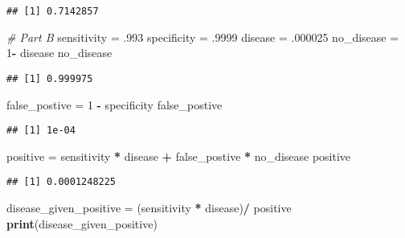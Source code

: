 \documentclass[
]{article}
\newenvironment{Shaded}{\begin{snugshade}}{\end{snugshade}}
\newcommand{\CommentTok}[1]{\textcolor[rgb]{0.56,0.35,0.01}{\textit{#1}}}
\newcommand{\DecValTok}[1]{\textcolor[rgb]{0.00,0.00,0.81}{#1}}
\newcommand{\FunctionTok}[1]{\textcolor[rgb]{0.13,0.29,0.53}{\textbf{#1}}}
\newcommand{\NormalTok}[1]{#1}
\newcommand{\OtherTok}[1]{\textcolor[rgb]{0.56,0.35,0.01}{#1}}
\newcommand{\SpecialCharTok}[1]{\textcolor[rgb]{0.81,0.36,0.00}{\textbf{#1}}}
\begin{document}
\begin{verbatim}
## [1] 0.7142857
\end{verbatim}

\begin{Shaded}
\begin{Highlighting}[]
\CommentTok{\# Part B}
\NormalTok{sensitivity }\OtherTok{=}\NormalTok{ .}\DecValTok{993}
\NormalTok{specificity }\OtherTok{=}\NormalTok{ .}\DecValTok{9999}
\NormalTok{disease }\OtherTok{=}\NormalTok{ .}\DecValTok{000025}
\NormalTok{no\_disease }\OtherTok{=} \DecValTok{1}\SpecialCharTok{{-}}\NormalTok{ disease}
\NormalTok{no\_disease}
\end{Highlighting}
\end{Shaded}

\begin{verbatim}
## [1] 0.999975
\end{verbatim}

\begin{Shaded}
\begin{Highlighting}[]
\NormalTok{false\_postive }\OtherTok{=} \DecValTok{1} \SpecialCharTok{{-}}\NormalTok{ specificity}
\NormalTok{false\_postive}
\end{Highlighting}
\end{Shaded}

\begin{verbatim}
## [1] 1e-04
\end{verbatim}

\begin{Shaded}
\begin{Highlighting}[]
\NormalTok{positive }\OtherTok{=}\NormalTok{ sensitivity }\SpecialCharTok{*}\NormalTok{ disease }\SpecialCharTok{+}\NormalTok{ false\_postive }\SpecialCharTok{*}\NormalTok{ no\_disease}
\NormalTok{positive}
\end{Highlighting}
\end{Shaded}

\begin{verbatim}
## [1] 0.0001248225
\end{verbatim}

\begin{Shaded}
\begin{Highlighting}[]
\NormalTok{disease\_given\_positive }\OtherTok{=}\NormalTok{ (sensitivity }\SpecialCharTok{*}\NormalTok{ disease)}\SpecialCharTok{/}\NormalTok{ positive}
\FunctionTok{print}\NormalTok{(disease\_given\_positive)}
\end{Highlighting}
\end{Shaded}
\end{document}
